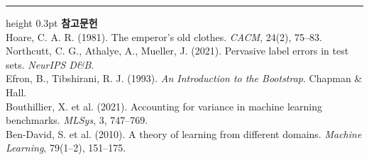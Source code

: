 \documentclass[10pt]{article}
\begin{document}
\vspace{0.6em}
\hrule height 0.3pt
\vspace{0.5em}
{\footnotesize
\textbf{참고문헌}\\[0.3em]
Hoare, C. A. R. (1981). The emperor's old clothes. \emph{CACM}, 24(2), 75--83.\\[0.15em]
Northcutt, C. G., Athalye, A., Mueller, J. (2021). Pervasive label errors in test
sets. \emph{NeurIPS D\&B}.\\[0.15em]
Efron, B., Tibshirani, R. J. (1993). \emph{An Introduction to the Bootstrap}.
Chapman \& Hall.\\[0.15em]
Bouthillier, X. et al. (2021). Accounting for variance in machine learning
benchmarks. \emph{MLSys}, 3, 747--769.\\[0.15em]
Ben-David, S. et al. (2010). A theory of learning from different domains.
\emph{Machine Learning}, 79(1--2), 151--175.
}
\end{document}
